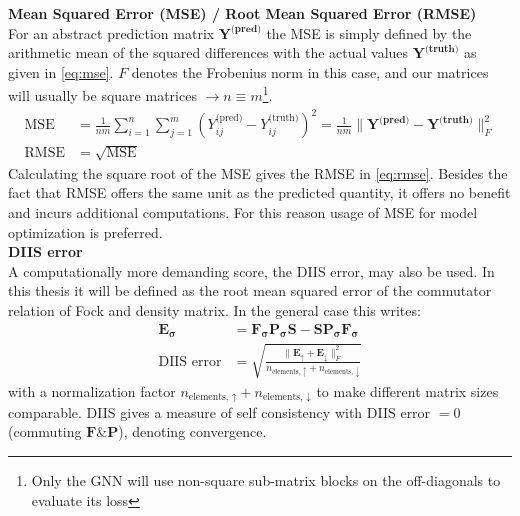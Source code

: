\textbf{Mean Squared Error (MSE) / Root Mean Squared Error (RMSE)}\\
For an abstract prediction matrix $\mathbf{Y^\text{(pred)}}$ the MSE is simply defined by the arithmetic mean of the squared differences with the actual values $\mathbf{Y^\text{(truth)}}$ as given in \autoref{eq:mse}. $F$ denotes the Frobenius norm in this case, and our matrices will usually be square matrices $\rightarrow n \equiv m$\footnote{Only the GNN will use non-square sub-matrix blocks on the off-diagonals to evaluate its loss}.  
\begin{subequations}
\begin{align}
\text{MSE} &= \frac{1}{nm} \sum_{i=1}^{n} \sum_{j=1}^{m} \left( Y^\text{(pred)}_{ij} - Y^\text{(truth)}_{ij} \right)^2 = \frac{1}{nm} \|\mathbf{Y^\text{(pred)}} - \mathbf{Y^\text{(truth)}}\|_F^2 \label{eq:mse}\\
\text{RMSE} &= \sqrt{ \text{MSE}}\label{eq:rmse}
\end{align}
\end{subequations}
Calculating the square root of the MSE gives the RMSE in \autoref{eq:rmse}. Besides the fact that RMSE offers the same unit as the predicted quantity, it offers no benefit and incurs additional computations. For this reason usage of MSE for model optimization is preferred. \\

\textbf{DIIS error}\\
A computationally more demanding score, the DIIS error, may also be used. In this thesis it will be defined as the root mean squared error of the commutator relation of Fock and density matrix. In the general case this writes: 
\begin{subequations}
\begin{align}
\mathbf{E_\sigma} &= \mathbf{F_\sigma} \mathbf{P_\sigma} \mathbf{S} - \mathbf{S} \mathbf{P_\sigma} \mathbf{F_\sigma}\\
\text{DIIS error} &= \sqrt{\frac{\|\mathbf{E_\uparrow} + \mathbf{E_\downarrow}\|^2_F}{n_\text{elements, $\uparrow$} + n_\text{elements, $\downarrow$}}}\label{eq:diis_error}
\end{align}
\end{subequations}
with a normalization factor $n_\text{elements, $\uparrow$} + n_\text{elements, $\downarrow$}$ to make different matrix sizes comparable. DIIS gives a measure of self consistency with DIIS error $=0$ (commuting $\mathbf{F} \& \mathbf{P}$), denoting convergence. 
